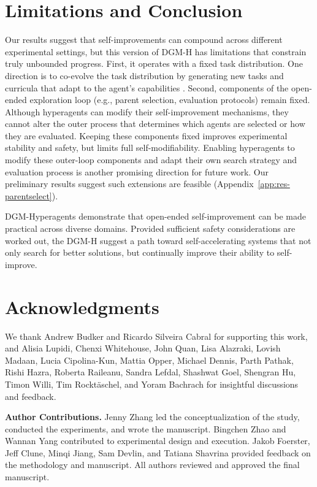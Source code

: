 \section{Limitations and Conclusion}
\label{sec:conclusion}

Our results suggest that self-improvements can compound across different experimental settings, but this version of DGM-H has limitations that constrain truly unbounded progress.
First, it operates with a fixed task distribution. One direction is to co-evolve the task distribution by generating new tasks and curricula that adapt to the agent's capabilities \citep{clune2019ai, zhangomni, faldoromni, bolton2025sima}.
Second, components of the open-ended exploration loop (e.g., parent selection, evaluation protocols) remain fixed. Although hyperagents can modify their self-improvement mechanisms, they cannot alter the outer process that determines which agents are selected or how they are evaluated. Keeping these components fixed improves experimental stability and safety, but limits full self-modifiability. Enabling hyperagents to modify these outer-loop components and adapt their own search strategy and evaluation process is another promising direction for future work. Our preliminary results suggest such extensions are feasible (Appendix~\ref{app:res-parentselect}).

DGM-Hyperagents demonstrate that open-ended self-improvement can be made practical across diverse domains. Provided sufficient safety considerations are worked out, the DGM-H suggest a path toward self-accelerating systems that not only search for better solutions, but continually improve their ability to self-improve.

\section*{Acknowledgments}

We thank Andrew Budker and Ricardo Silveira Cabral for supporting this work, and Alisia Lupidi, Chenxi Whitehouse, John Quan, Lisa Alazraki, Lovish Madaan, Lucia Cipolina-Kun, Mattia Opper, Michael Dennis, Parth Pathak, Rishi Hazra, Roberta Raileanu, Sandra Lefdal, Shashwat Goel, Shengran Hu, Timon Willi, Tim Rockt\"{a}schel, and Yoram Bachrach for insightful discussions and feedback.

\textbf{Author Contributions.}
Jenny Zhang led the conceptualization of the study, conducted the experiments, and wrote the manuscript. Bingchen Zhao and Wannan Yang contributed to experimental design and execution. Jakob Foerster, Jeff Clune, Minqi Jiang, Sam Devlin, and Tatiana Shavrina provided feedback on the methodology and manuscript. All authors reviewed and approved the final manuscript.
